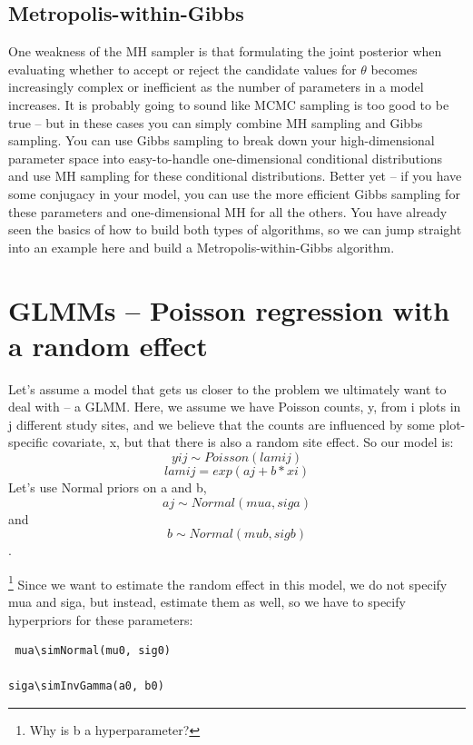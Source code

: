 \subsection{ Metropolis-within-Gibbs }
One weakness of the MH sampler is that formulating the joint posterior when evaluating whether to accept or reject the candidate values for $\theta$ becomes increasingly complex or inefficient as the number of parameters in a model increases. It is probably going to sound like MCMC sampling is too good to be true – but in these cases you can simply combine MH sampling and Gibbs sampling. You can use Gibbs sampling to break down your high-dimensional parameter space into easy-to-handle one-dimensional conditional distributions and use MH sampling for these conditional distributions. Better yet – if you have some conjugacy in your model, you can use the more efficient Gibbs sampling for these parameters and one-dimensional MH for all the others. You have already seen the basics of how to build both types of algorithms, so we can jump straight into an example here and build a Metropolis-within-Gibbs algorithm.
\section{ GLMMs – Poisson regression with a random effect }
Let's assume a model that gets us closer to the problem we ultimately want to deal with – a GLMM. Here, we assume we have Poisson counts, y, from i plots in j different study sites, and we believe that the counts are influenced by some plot-specific covariate, x, but that there is also a random site effect. So our model is:
\[
yij \sim Poisson (lamij)
\]
\[
lamij = exp (aj + b*xi)
\]
Let's use Normal priors on a and b,  \[
aj \sim Normal (mua, siga)
\] 
and 
\[b \sim Normal (mub, sigb)\].

\footnote{Why is b a hyperparameter?}
Since we want to estimate the random effect in this model, we do not
specify mua and siga, but instead, estimate them as well, so we have
to specify hyperpriors for these parameters:
\begin{verbatim}
 mua\simNormal(mu0, sig0)

siga\simInvGamma(a0, b0)
\end{verbatim}

